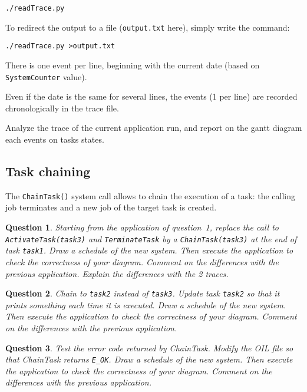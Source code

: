 \documentclass[11pt]{report}
\newtheorem{ex}{Question}
\begin{document}
\begin{lstlisting}
./readTrace.py
\end{lstlisting}

To redirect the output to a file (\texttt{output.txt} here), simply write the command:
\begin{lstlisting}
./readTrace.py >output.txt
\end{lstlisting}


There is one event per line, beginning with the current date (based on \texttt{SystemCounter} value).

Even if the date is the same for several lines, the events (1 per line) are recorded chronologically in the trace file.

Analyze the trace of the current application run, and report on the gantt diagram each events on tasks states.

\subsection{Task chaining}

The \texttt{ChainTask()} system call allows to chain the execution of a task: the calling job terminates and a new job of the target task is created.

\begin{ex}
  Starting from the application of question~1, replace the call to \texttt{ActivateTask(task3)} and \texttt{TerminateTask} by a \texttt{ChainTask(task3)} at the end of task \texttt{task1}.
  Draw a schedule of the new system. Then execute the application to check the correctness of your diagram.
  Comment on the differences with the previous application. Explain the differences with the 2 traces.
\end{ex}

\begin{ex}
  Chain to \texttt{task2} instead of \texttt{task3}.
  Update task \texttt{task2} so that it prints something each time it is executed.
  Draw a schedule of the new system.
  Then execute the application to check the correctness of your diagram.
  Comment on the differences with the previous application.
\end{ex}

\begin{ex}
  Test the error code returned by ChainTask.
  Modify the OIL file so that ChainTask returns \texttt{E\_OK}.
  Draw a schedule of the new system.
  Then execute the application to check the correctness of your diagram.
  Comment on the differences with the previous application.
\end{ex}
\end{document}

